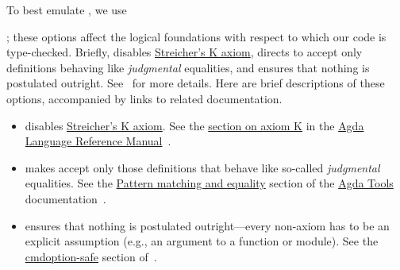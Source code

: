 To best emulate \mltt, we use
\begin{code}[inline]%
\>[0]\AgdaSymbol{\{-\#}\AgdaSpace{}%
\AgdaSpace{}%
\AgdaSpace{}%
\AgdaSpace{}%
\AgdaSpace{}%
\AgdaSymbol{\#-\}}\<%
\end{code}
; these options affect the logical foundations with respect to which our code is type-checked.
\ifshort
Briefly,
 disables
\href{https://ncatlab.org/nlab/show/axiom+K+%28type+theory%29}{Streicher's K axiom},
 directs \agda to accept only definitions behaving like
{\it judgmental} equalities, and
 ensures that nothing is postulated outright.
See~\cite{agdaref-axiomk,agdaref-safeagda,agdatools-patternmatching} for more details.
\else
Here are brief descriptions of these options, accompanied by links to related documentation.
\begin{itemize}
\item
{} disables \href{https://ncatlab.org/nlab/show/axiom+K+%28type+theory%29}{Streicher's K axiom}.
See the \href{https://agda.readthedocs.io/en/v2.6.1/language/without-k.html}{section on axiom K} in
the \href{https://agda.readthedocs.io/en/v2.6.1.3/language}{Agda Language Reference Manual}~\cite{agdaref-axiomk}.
\item
{} makes \agda accept only those definitions that behave like so-called {\it judgmental} equalities.
See the \href{https://agda.readthedocs.io/en/v2.6.1/tools/command-line-options.html#pattern-matching-and-equality}%
{Pattern matching and equality} section of
the \href{https://agda.readthedocs.io/en/v2.6.1.3/tools/}{Agda Tools} documentation~\cite{agdatools-patternmatching}.
\item
{} ensures that nothing is postulated outright---every non-\mltt axiom has to be an explicit assumption (e.g., an argument to a function or module).
See the \href{https://agda.readthedocs.io/en/v2.6.1/tools/command-line-options.html#cmdoption-safe}{cmdoption-safe} section of~\cite{agdaref-safeagda}.
\end{itemize}
\fi

